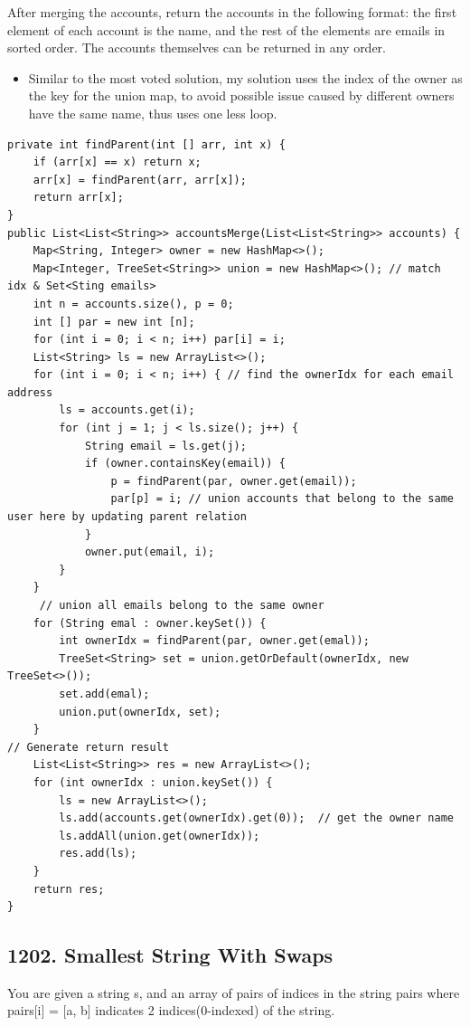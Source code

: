 \documentclass[9pt, b5paper]{article}
\begin{document}
After merging the accounts, return the accounts in the following format: the first element of each account is the name, and the rest of the elements are emails in sorted order. The accounts themselves can be returned in any order.

\begin{itemize}
\item Similar to the most voted solution, my solution uses the index of the owner as the key for the union map, to avoid possible issue caused by different owners have the same name, thus uses one less loop.
\end{itemize}

\begin{verbatim}
private int findParent(int [] arr, int x) {
    if (arr[x] == x) return x;
    arr[x] = findParent(arr, arr[x]);
    return arr[x];
}
public List<List<String>> accountsMerge(List<List<String>> accounts) {
    Map<String, Integer> owner = new HashMap<>();
    Map<Integer, TreeSet<String>> union = new HashMap<>(); // match idx & Set<Sting emails>
    int n = accounts.size(), p = 0;
    int [] par = new int [n];
    for (int i = 0; i < n; i++) par[i] = i;
    List<String> ls = new ArrayList<>(); 
    for (int i = 0; i < n; i++) { // find the ownerIdx for each email address
        ls = accounts.get(i);
        for (int j = 1; j < ls.size(); j++) {
            String email = ls.get(j);
            if (owner.containsKey(email)) {
                p = findParent(par, owner.get(email));
                par[p] = i; // union accounts that belong to the same user here by updating parent relation
            }
            owner.put(email, i);
        }
    }
     // union all emails belong to the same owner
    for (String emal : owner.keySet()) {
        int ownerIdx = findParent(par, owner.get(emal));
        TreeSet<String> set = union.getOrDefault(ownerIdx, new TreeSet<>());
        set.add(emal);
        union.put(ownerIdx, set);
    }
// Generate return result
    List<List<String>> res = new ArrayList<>();
    for (int ownerIdx : union.keySet()) {
        ls = new ArrayList<>();
        ls.add(accounts.get(ownerIdx).get(0));  // get the owner name
        ls.addAll(union.get(ownerIdx));
        res.add(ls);
    }
    return res;
}
\end{verbatim}

\subsection{1202. Smallest String With Swaps}
\label{sec-11-4}
You are given a string s, and an array of pairs of indices in the string pairs where pairs[i] = [a, b] indicates 2 indices(0-indexed) of the string.
\end{document}
